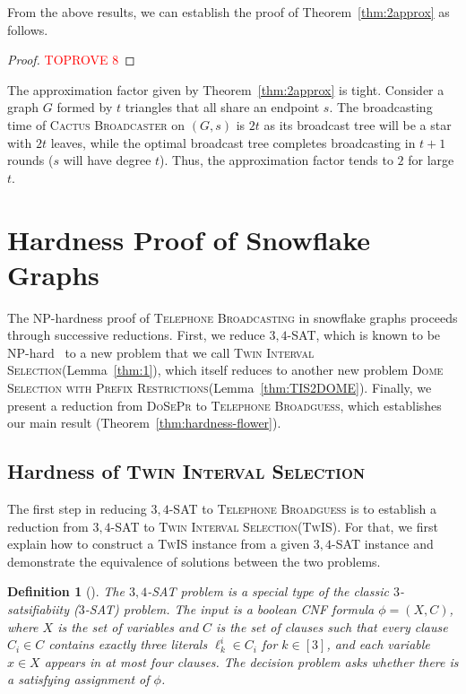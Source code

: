 \documentclass[letterpaper,11pt]{article}
\newtheorem{definition}[theorem]{Definition}
\newcommand{\flower}{snowflake\xspace}
\newcommand{\Flower}{Snowflake\xspace}
\newcommand{\telebr}{\textsc{Telephone Broadcasting}\xspace}
\newcommand{\sattt}{\textsc{$3$-SAT}\xspace}
\newcommand{\sssattt}{\textsc{$3,4$-SAT}\xspace}
\newcommand{\tis}{\textsc{TwIS}\xspace}
\newcommand{\tislong}{\textsc{Twin Interval Selection}\xspace}
\newcommand{\dspr}{\textsc{DoSePr}\xspace}
\newcommand{\dsprlong}{\textsc{Dome Selection with Prefix Restrictions}\xspace}
\newcommand{\telebg}{\textsc{Telephone Broadguess}\xspace}
\newcommand{\ouralgo}{\textsc{Cactus Broadcaster}\xspace}
\begin{document}
From the above results, we can establish the proof of Theorem~\ref{thm:2approx} as follows.

\begin{proof}\textcolor{red}{TOPROVE 8}\end{proof}

The approximation factor given by Theorem~\ref{thm:2approx} is tight. Consider a graph $G$ formed by $t$ triangles that all share an endpoint $s$. The broadcasting time of \ouralgo on $(G,s)$ is $2t$ as its broadcast tree will be a star with $2t$ leaves, while the optimal broadcast tree completes broadcasting in $t+1$ rounds ($s$ will have degree $t$). 
Thus, the approximation factor tends to $2$ for large $t$. 



 \section{Hardness Proof of \Flower Graphs}
\label{sec:hardness}

The NP-hardness proof of \telebr in \flower graphs proceeds through successive reductions. First, we reduce \sssattt, which is known to be NP-hard~\cite{tovey1984simplified} to a new problem that we call \tislong (Lemma~\ref{thm:1}), which itself reduces to another new problem \dsprlong (Lemma~\ref{thm:TIS2DOME}). Finally, we present a reduction from \dspr to \telebg, which establishes our main result (Theorem~\ref{thm:hardness-flower}).
 \subsection{Hardness of \tislong}\label{sec:tishard}
The first step in reducing \sssattt to \telebg is to establish a reduction from \sssattt to \tislong (\tis). For that, we first explain how 
to construct a \tis instance from a given \sssattt instance and demonstrate the equivalence of solutions between the two problems. 

\begin{definition}[\cite{tovey1984simplified}]

The \emph{\sssattt} problem is a special type of the classic $3$-satsifiabiity (\sattt) problem. The input is a boolean CNF formula $\phi=(X, C)$, where $X$ is the set of variables and $C$ is the set of clauses 
such that every clause $C_i \in C$ contains \emph{exactly} three literals $\ell^i_k\in C_i$ for $k\in [3]$, and each variable $x\in X$ appears in at most four clauses. The decision problem asks whether there is a satisfying assignment of $\phi$.
\end{definition}
\end{document}
